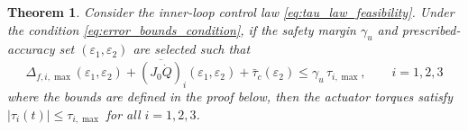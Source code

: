 \documentclass[journal]{new-aiaa}
\newtheorem{theorem}{Theorem}
\begin{document}
\begin{theorem}
\label{thm:feasibility_axis_compact2}
Consider the inner-loop control law \eqref{eq:tau_law_feasibility}. Under the condition \eqref{eq:error_bounds_condition},
if the safety margin $\gamma_u$ and prescribed-accuracy set $(\varepsilon_1,\varepsilon_2)$ are selected such that
\begin{equation}
\Delta_{f,i,\max}(\varepsilon_1,\varepsilon_2)
+\overline{(J_0 \dot Q)}_i(\varepsilon_1,\varepsilon_2)
+\bar\tau_c(\varepsilon_2)
\le \gamma_u\,\tau_{i,\max},\qquad i=1,2,3
\label{eq:thm4_axis_condition_compact2}
\end{equation}
where the bounds are defined in the proof below,
then the actuator torques satisfy $|\tau_i(t)|\le \tau_{i,\max}$ for all $i=1,2,3$.
\end{theorem}
\end{document}
